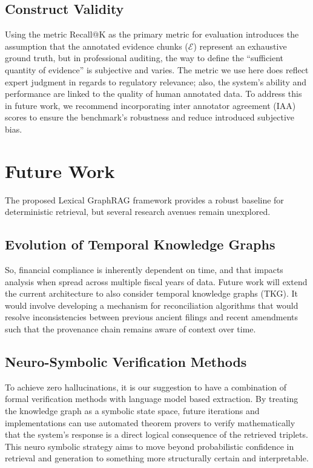 \documentclass[conference]{IEEEtran}
\begin{document}
\subsection{Construct Validity}
Using the metric Recall@K as the primary metric for evaluation introduces the assumption that the annotated evidence chunks ($\mathcal{E}$) represent an exhaustive ground truth, but in professional auditing, the way to define the \enquote{sufficient quantity of evidence} is subjective and varies. The metric we use here does reflect expert judgment in regards to regulatory relevance; also, the system's ability and performance are linked to the quality of human annotated data. To address this in future work, we recommend incorporating inter annotator agreement (IAA) scores to ensure the benchmark's robustness and reduce introduced subjective bias.

\section{Future Work}
The proposed Lexical GraphRAG framework provides a robust baseline for deterministic retrieval, but several research avenues remain unexplored.

\subsection{Evolution of Temporal Knowledge Graphs}
So, financial compliance is inherently dependent on time, and that impacts analysis when spread across multiple fiscal years of data. Future work will extend the current architecture to also consider temporal knowledge graphs (TKG). It would involve developing a mechanism for reconciliation algorithms that would resolve inconsistencies between previous ancient filings and recent amendments such that the provenance chain remains aware of context over time.

\subsection{Neuro-Symbolic Verification Methods}
To achieve zero hallucinations, it is our suggestion to have a combination of formal verification methods with language model based extraction. By treating the knowledge graph as a symbolic state space, future iterations and implementations can use automated theorem provers to verify mathematically that the system's response is a direct logical consequence of the retrieved triplets. This neuro symbolic strategy aims to move beyond probabilistic confidence in retrieval and generation to something more structurally certain and interpretable.
\end{document}
